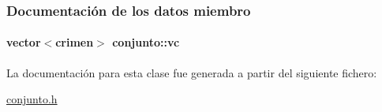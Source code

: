 \subsubsection{Documentación de los datos miembro}
\hypertarget{classconjunto_aed485e92bb3d8b2c82fc85657947761d}{
\paragraph[{vc}]{\setlength{\rightskip}{0pt plus 5cm}vector$<${\bf crimen}$>$ conjunto\+::vc\hspace{0.3cm}{\ttfamily [private]}}}\label{classconjunto_aed485e92bb3d8b2c82fc85657947761d}


La documentación para esta clase fue generada a partir del siguiente fichero\+:\begin{DoxyCompactItemize}
\item 
\hyperlink{conjunto_8h}{conjunto.\+h}\end{DoxyCompactItemize}
